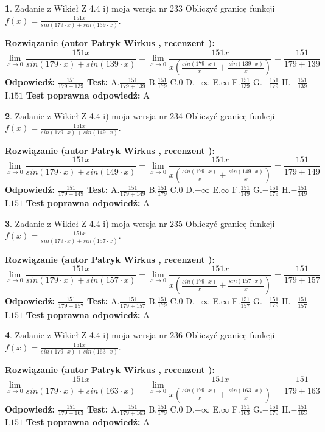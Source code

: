 \documentclass[12pt, a4paper]{article}
\theoremstyle{definition} %
\newtheorem{zad}{}
\newcommand{\zadStart}[1]{\begin{zad}#1\newline}
\newcommand{\zadStop}{\end{zad}}
\newcommand{\rozwStart}[2]{\noindent \textbf{Rozwiązanie (autor #1 , recenzent #2): }\newline}
\newcommand{\rozwStop}{\newline}
\newcommand{\odpStart}{\noindent \textbf{Odpowiedź:}\newline}
\newcommand{\odpStop}{\newline}
\newcommand{\testStart}{\noindent \textbf{Test:}\newline}
\newcommand{\testStop}{\newline}
\newcommand{\kluczStart}{\noindent \textbf{Test poprawna odpowiedź:}\newline}
\newcommand{\kluczStop}{\newline}
\begin{document}
\zadStart{Zadanie z Wikieł Z 4.4 i) moja wersja nr 233}
Obliczyć granicę funkcji $f(x)=\frac{151x}{sin(179\cdot x) +sin(139\cdot x)}$.
\zadStop
\rozwStart{Patryk Wirkus}{}
$$\lim\limits_{x\to 0}\frac{151x}{sin(179\cdot x) +sin(139\cdot x)}=\lim\limits_{x\to 0}\frac{151x}{x(\frac{sin(179\cdot x)}{x}+\frac{sin(139\cdot x)}{x})}=\frac{151}{179+139}$$
\rozwStop
\odpStart
$\frac{151}{179+139}$
\odpStop
\testStart
A.$\frac{151}{179+139}$
B.$\frac{151}{179}$
C.$0$
D.$-\infty$
E.$\infty$
F.$\frac{151}{139}$
G.$-\frac{151}{179}$
H.$-\frac{151}{139}$
I.$151$
\testStop
\kluczStart
A
\kluczStop



\zadStart{Zadanie z Wikieł Z 4.4 i) moja wersja nr 234}
Obliczyć granicę funkcji $f(x)=\frac{151x}{sin(179\cdot x) +sin(149\cdot x)}$.
\zadStop
\rozwStart{Patryk Wirkus}{}
$$\lim\limits_{x\to 0}\frac{151x}{sin(179\cdot x) +sin(149\cdot x)}=\lim\limits_{x\to 0}\frac{151x}{x(\frac{sin(179\cdot x)}{x}+\frac{sin(149\cdot x)}{x})}=\frac{151}{179+149}$$
\rozwStop
\odpStart
$\frac{151}{179+149}$
\odpStop
\testStart
A.$\frac{151}{179+149}$
B.$\frac{151}{179}$
C.$0$
D.$-\infty$
E.$\infty$
F.$\frac{151}{149}$
G.$-\frac{151}{179}$
H.$-\frac{151}{149}$
I.$151$
\testStop
\kluczStart
A
\kluczStop



\zadStart{Zadanie z Wikieł Z 4.4 i) moja wersja nr 235}
Obliczyć granicę funkcji $f(x)=\frac{151x}{sin(179\cdot x) +sin(157\cdot x)}$.
\zadStop
\rozwStart{Patryk Wirkus}{}
$$\lim\limits_{x\to 0}\frac{151x}{sin(179\cdot x) +sin(157\cdot x)}=\lim\limits_{x\to 0}\frac{151x}{x(\frac{sin(179\cdot x)}{x}+\frac{sin(157\cdot x)}{x})}=\frac{151}{179+157}$$
\rozwStop
\odpStart
$\frac{151}{179+157}$
\odpStop
\testStart
A.$\frac{151}{179+157}$
B.$\frac{151}{179}$
C.$0$
D.$-\infty$
E.$\infty$
F.$\frac{151}{157}$
G.$-\frac{151}{179}$
H.$-\frac{151}{157}$
I.$151$
\testStop
\kluczStart
A
\kluczStop



\zadStart{Zadanie z Wikieł Z 4.4 i) moja wersja nr 236}
Obliczyć granicę funkcji $f(x)=\frac{151x}{sin(179\cdot x) +sin(163\cdot x)}$.
\zadStop
\rozwStart{Patryk Wirkus}{}
$$\lim\limits_{x\to 0}\frac{151x}{sin(179\cdot x) +sin(163\cdot x)}=\lim\limits_{x\to 0}\frac{151x}{x(\frac{sin(179\cdot x)}{x}+\frac{sin(163\cdot x)}{x})}=\frac{151}{179+163}$$
\rozwStop
\odpStart
$\frac{151}{179+163}$
\odpStop
\testStart
A.$\frac{151}{179+163}$
B.$\frac{151}{179}$
C.$0$
D.$-\infty$
E.$\infty$
F.$\frac{151}{163}$
G.$-\frac{151}{179}$
H.$-\frac{151}{163}$
I.$151$
\testStop
\kluczStart
A
\kluczStop
\end{document}
